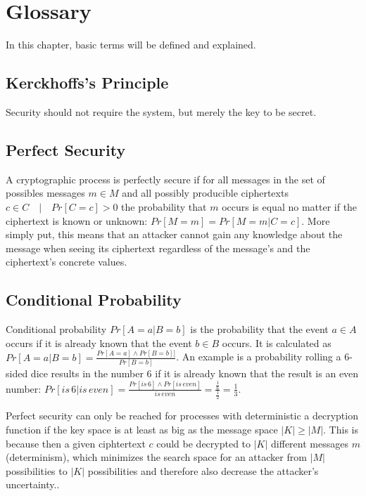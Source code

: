 \chapter{Glossary}

In this chapter, basic terms will be defined and explained.

\section{Kerckhoffs's Principle}

Security should not require the system, but merely the key to be secret.

\section{Perfect Security}
\label{sec:gloss:perf_sec}

A cryptographic process is perfectly secure if for all messages in the set of possibles messages $m \in M$ and all possibly producible ciphertexts $c \in C \quad|\quad Pr[C=c] > 0$ the probability that $m$ occurs is equal no matter if the ciphertext is known or unknown: $Pr[M=m] = Pr[M=m | C=c]$. More simply put, this means that an attacker cannot gain any knowledge about the message when seeing its ciphertext regardless of the message's and the ciphertext's concrete values.

\section{Conditional Probability}

Conditional probability $Pr[A=a | B=b]$ is the probability that the event $a \in A$ occurs if it is already known that the event $b \in B$ occurs. It is calculated as $Pr[A=a | B=b] = \frac{Pr[A=a] \wedge Pr[B=b]]}{Pr[B=b]}$. An example is a probability rolling a 6-sided dice results in the number 6 if it is already known that the result is an even number: $Pr[is\,6 | is\,even] = \frac{Pr[is\,6] \wedge Pr[is\,even]}{is\,even} = \frac{\frac{1}{6}}{\frac{1}{2}} = \frac{1}{3}$.

Perfect security can only be reached for processes with deterministic a decryption function if the key space is at least as big as the message space $|K| \geq |M|$. This is because then a given ciphtertext $c$ could be decrypted to $|K|$ different messages $m$ (determinism), which minimizes the search space for an attacker from $|M|$ possibilities to $|K|$ possibilities and therefore also decrease the attacker's uncertainty..

